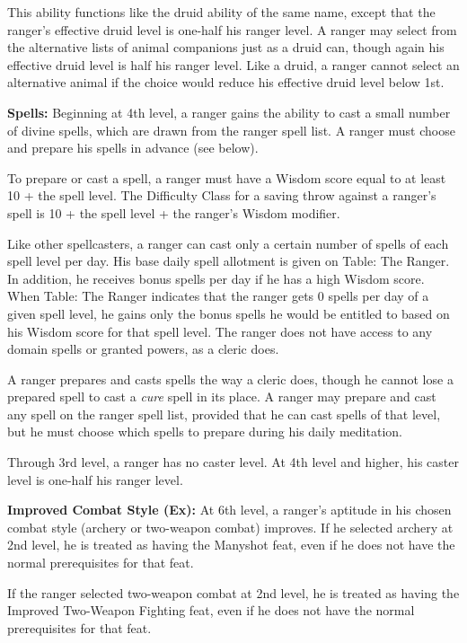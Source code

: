 \documentclass{article}
\begin{document}
This ability functions like the druid ability of the same name, except that the 
ranger's effective druid level is one-half his ranger level. A ranger may select 
from the alternative lists of animal companions just as a druid can, though again 
his effective druid level is half his ranger level. Like a druid, a ranger cannot 
select an alternative animal if the choice would reduce his effective druid level 
below 1st.

\textbf{Spells:} Beginning at 4th level, a ranger gains the ability to cast a small 
number of divine spells, which are drawn from the ranger spell list. A ranger must 
choose and prepare his spells in advance (see below).

To prepare or cast a spell, a ranger must have a Wisdom score equal to at least 
10 + the spell level. The Difficulty Class for a saving throw against a ranger's 
spell is 10 + the spell level + the ranger's Wisdom modifier.

Like other spellcasters, a ranger can cast only a certain number of spells of each 
spell level per day. His base daily spell allotment is given on Table: The Ranger. 
In addition, he receives bonus spells per day if he has a high Wisdom score. When 
Table: The Ranger indicates that the ranger gets 0 spells per day of a given spell 
level, he gains only the bonus spells he would be entitled to based on his Wisdom 
score for that spell level. The ranger does not have access to any domain spells 
or granted powers, as a cleric does.

A ranger prepares and casts spells the way a cleric does, though he cannot lose 
a prepared spell to cast a \textit{cure }spell in its place. A ranger may prepare 
and cast any spell on the ranger spell list, provided that he can cast spells of 
that level, but he must choose which spells to prepare during his daily meditation.

Through 3rd level, a ranger has no caster level. At 4th level and higher, his caster 
level is one-half his ranger level.

\textbf{Improved Combat Style (Ex):} At 6th level, a ranger's aptitude in his chosen 
combat style (archery or two-weapon combat) improves. If he selected archery at 
2nd level, he is treated as having the Manyshot feat, even if he does not have 
the normal prerequisites for that feat.

If the ranger selected two-weapon combat at 2nd level, he is treated as having 
the Improved Two-Weapon Fighting feat, even if he does not have the normal prerequisites 
for that feat.
\end{document}
